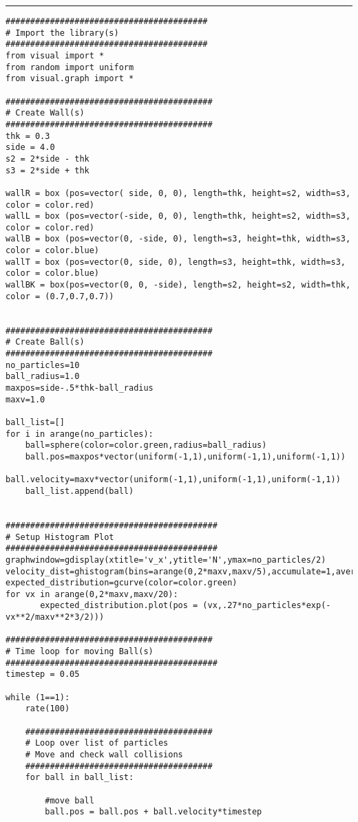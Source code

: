 \documentclass[a4]{article}
\begin{document}
{\color{code}\hrule
\begin{verbatim}
#########################################
# Import the library(s)
#########################################
from visual import *
from random import uniform
from visual.graph import *

##########################################
# Create Wall(s)
##########################################
thk = 0.3
side = 4.0
s2 = 2*side - thk
s3 = 2*side + thk

wallR = box (pos=vector( side, 0, 0), length=thk, height=s2, width=s3, color = color.red)
wallL = box (pos=vector(-side, 0, 0), length=thk, height=s2, width=s3, color = color.red)
wallB = box (pos=vector(0, -side, 0), length=s3, height=thk, width=s3, color = color.blue)
wallT = box (pos=vector(0, side, 0), length=s3, height=thk, width=s3, color = color.blue)
wallBK = box(pos=vector(0, 0, -side), length=s2, height=s2, width=thk, color = (0.7,0.7,0.7))


##########################################
# Create Ball(s)
##########################################
no_particles=10
ball_radius=1.0
maxpos=side-.5*thk-ball_radius
maxv=1.0

ball_list=[]
for i in arange(no_particles):
    ball=sphere(color=color.green,radius=ball_radius)
    ball.pos=maxpos*vector(uniform(-1,1),uniform(-1,1),uniform(-1,1))
    ball.velocity=maxv*vector(uniform(-1,1),uniform(-1,1),uniform(-1,1))
    ball_list.append(ball)


###########################################
# Setup Histogram Plot
###########################################
graphwindow=gdisplay(xtitle='v_x',ytitle='N',ymax=no_particles/2)
velocity_dist=ghistogram(bins=arange(0,2*maxv,maxv/5),accumulate=1,average=1)
expected_distribution=gcurve(color=color.green)
for vx in arange(0,2*maxv,maxv/20):
       expected_distribution.plot(pos = (vx,.27*no_particles*exp(-vx**2/maxv**2*3/2)))

##########################################
# Time loop for moving Ball(s)
###########################################
timestep = 0.05

while (1==1):
    rate(100)

    ######################################
    # Loop over list of particles
    # Move and check wall collisions
    ######################################
    for ball in ball_list:

        #move ball
        ball.pos = ball.pos + ball.velocity*timestep


\end{verbatim}}
\end{document}
